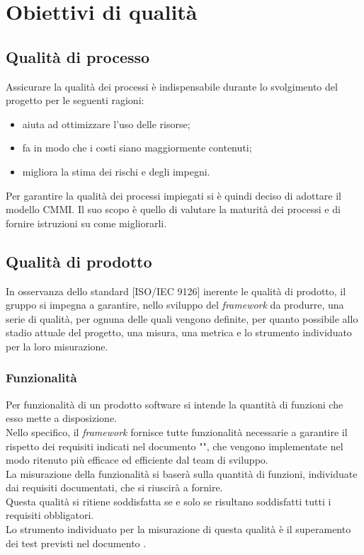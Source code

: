 
\section{Obiettivi di qualità}
	\subsection{Qualità di processo}
		Assicurare la qualità dei processi è indispensabile durante lo svolgimento del progetto per le seguenti ragioni:
		\begin{itemize}
			\item aiuta ad ottimizzare l'uso delle risorse;
			\item fa in modo che i costi siano maggiormente contenuti;
			\item migliora la stima dei rischi e degli impegni.
		\end{itemize}
		Per garantire la qualità dei processi impiegati si è quindi deciso di adottare il modello CMMI. Il suo scopo è quello di valutare la maturità dei 
		processi e di fornire istruzioni su come migliorarli.
	\subsection{Qualità di prodotto}
		In osservanza dello standard [ISO/IEC 9126] inerente le qualità di prodotto, il gruppo \groupname{} si impegna a garantire, nello sviluppo del \textit{framework} da produrre, una serie di qualità, per ognuna delle quali vengono definite, per quanto possibile allo stadio attuale del progetto, una misura, una metrica e lo strumento individuato per la loro misurazione.
		\subsubsection{Funzionalità}
			Per funzionalità di un prodotto software si intende la quantità di funzioni che esso mette a disposizione.\\
			Nello specifico, il \textit{framework} fornisce tutte funzionalità necessarie a garantire il rispetto dei requisiti indicati nel documento "", che vengono implementate nel modo ritenuto più efficace ed efficiente dal team di sviluppo.\\
			La misurazione della funzionalità si baserà sulla quantità di funzioni, individuate dai requisiti documentati, che si riuscirà a fornire.\\
			Questa qualità si ritiene soddisfatta se e solo se risultano soddisfatti tutti i requisiti obbligatori.\\
			Lo strumento individuato per la misurazione di questa qualità è il superamento dei test previsti nel documento .
